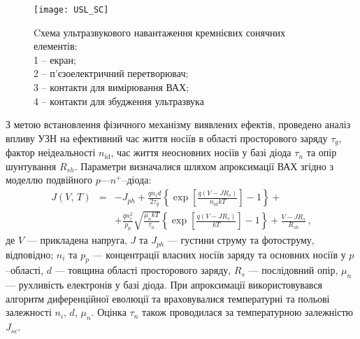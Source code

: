 \begin{SCfigure}
\texttt{[image: USL\_SC]}
\caption{\label{USL_SC}
Cхема ультразвукового навантаження кремнієвих сонячних елементів: \protect\\
1 --  екран;\protect\\
2 -- п'єзоелектричний перетворювач;\protect\\
3 -- контакти для вимірювання ВАХ;\protect\\
4 -- контакти для збудження ультразвука
}
\end{SCfigure}

З метою встановлення фізичного механізму
виявлених ефектів, проведено аналіз впливу УЗН на
ефективний час життя носіїв в області просторового заряду $\tau_{g}$,
фактор неідеальності $n_\mathrm{id}$,
час життя неосновних носіїв у базі діода $\tau_n$
та  опір шунтування $R_{sh}$.
Параметри визначалися шляхом апроксимації ВАХ згідно з моделлю подвійного $p$---$n^+$--діода:
\begin{eqnarray}
\label{eqSSCIV}
\nonumber J(V,\,T)&=&-J_{ph}+\frac{qn_id}{2\tau_{g}}\left\{\exp \left[\frac{q(V-JR_s)}{n_\mathrm{id}kT}\right]-1\right\}+\\
&&+\frac{qn_i^2}{p_p}\sqrt{\frac{\mu_nkT}{\tau_n}}\left\{\exp \left[\frac{q(V-JR_s)}{kT}\right]-1\right\}+\frac{V-JR_s}{R_{sh}}\,,
\end{eqnarray}
де
$V$ --- прикладена напруга,
$J$ та $J_{ph}$ --- густини струму та фотоструму, відповідно;
$n_i$ та $p_p$ --- концентрації власних носіїв заряду та основних носіїв у $p$--області,
$d$ --- товщина області просторового заряду,
$R_s$ --- послідовний опір,
$\mu_n$ --- рухливість електронів у базі діода.
При апроксимації використовувався алгоритм диференційної еволюції та враховувалися температурні та польові залежності $n_i$, $d$, $\mu_n$.
Оцінка $\tau_n$ також проводилася за температурною залежністю $J_{sc}$.

